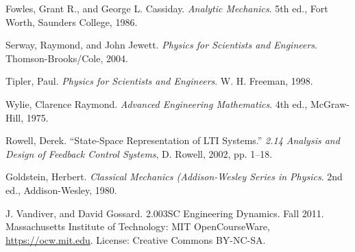 \begin{thebibliography}{12}
Fowles, Grant R., and George L. Cassiday. \emph{Analytic Mechanics}. 5th ed., Fort Worth, Saunders College, 1986.

Serway, Raymond, and John Jewett. \emph{Physics for Scientists and Engineers}. Thomson-Brooks/Cole, 2004.

Tipler, Paul. \emph{Physics for Scientists and Engineers}. W. H. Freeman, 1998.

Wylie, Clarence Raymond. \emph{Advanced Engineering Mathematics}. 4th ed., McGraw-Hill, 1975.

Rowell, Derek. “State-Space Representation of LTI Systems.” \emph{2.14 Analysis and Design of Feedback Control Systems}, D. Rowell, 2002, pp. 1–18.



Goldstein, Herbert. \emph{Classical Mechanics (Addison-Wesley Series in Physics}. 2nd ed., Addison-Wesley, 1980.

J. Vandiver, and David Gossard. 2.003SC Engineering Dynamics. Fall 2011. Massachusetts Institute of Technology: MIT OpenCourseWare, \url{https://ocw.mit.edu}. License: Creative Commons BY-NC-SA.




\end{thebibliography}


